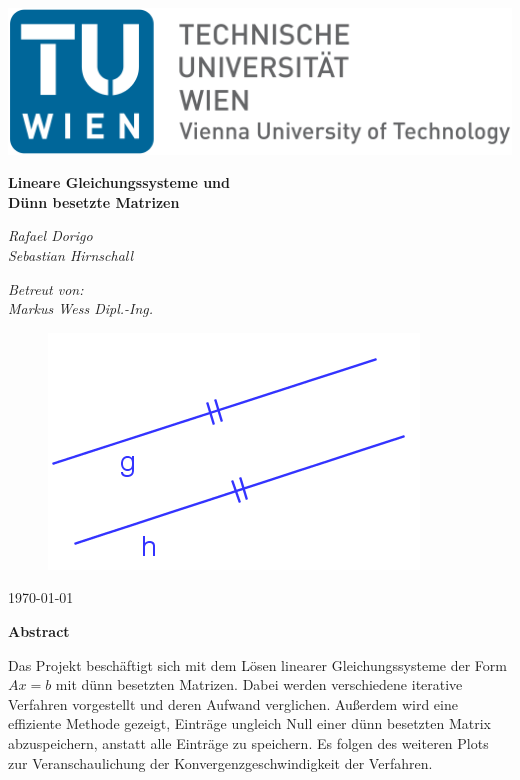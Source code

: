 \documentclass[12pt,a4paper]{scrartcl}
\author{Rafael Dorigo, Sebastian Hirnschall}
\date{\today}
\numberwithin{equation}{section}
\numberwithin{myalgctr}{section}
\numberwithin{mytheoremctr}{subsection}
\numberwithin{mykorollarctr}{subsection}
\numberwithin{mylemmactr}{subsection}
\numberwithin{mybeispielctr}{subsection}
\begin{document}
	\begin{titlepage}
		\begin{flushleft}
				\includegraphics[width=.4\linewidth]{tuwien.png}
		\end{flushleft}	
		\centering
		
		
		\vspace{5cm}
		{\huge\bfseries Lineare Gleichungssysteme und \\Dünn besetzte Matrizen\par}
		\vspace{2cm}
		{\Large\itshape Rafael Dorigo\\Sebastian Hirnschall\par}
		\vspace{1cm}
		{\large\itshape Betreut von:\\Markus Wess Dipl.-Ing.\par}
		\vspace{1cm}
		\begin{figure}[!h]
			\vspace{0cm}
			\centering
			\includegraphics[width=.4\linewidth]{titelbild2.png}
		\end{figure}
		
		\vfill
		
		{\today\par}
	\end{titlepage}
	\restoregeometry
	
	\thispagestyle{firststyle}
	
	\newpage\noindent
	{\LARGE \bfseries Abstract}
	\newline
	\par\noindent
	
	Das Projekt beschäftigt sich mit dem Lösen linearer Gleichungssysteme der Form $Ax = b$ mit dünn besetzten Matrizen. Dabei werden verschiedene iterative Verfahren vorgestellt und deren Aufwand verglichen. Außerdem wird eine effiziente Methode gezeigt, Einträge ungleich Null einer dünn besetzten Matrix abzuspeichern, anstatt alle Einträge zu speichern. Es folgen des weiteren Plots zur Veranschaulichung der Konvergenzgeschwindigkeit der Verfahren.
	\thispagestyle{firststyle}
	
\end{document}
